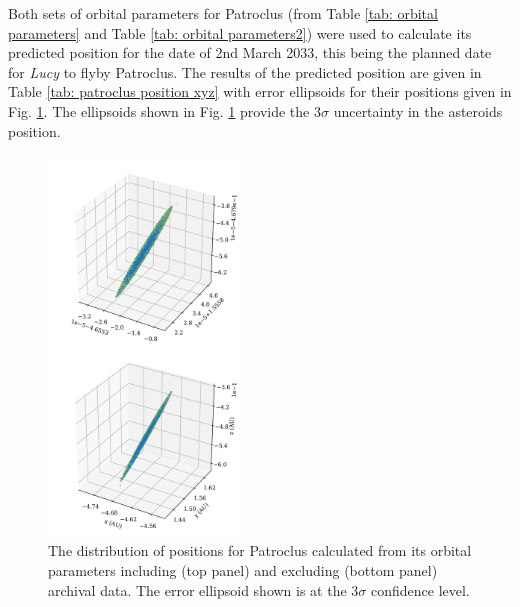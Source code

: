 \documentclass[10pt, twocolumn]{revtex4}    %
\begin{document}
Both sets of orbital parameters for Patroclus (from Table \ref{tab: orbital parameters} and Table \ref{tab: orbital parameters2}) were used to calculate its predicted position for the date of 2nd March 2033, this being the planned date for \textit{Lucy} to flyby Patroclus. The results of the predicted position are given in Table \ref{tab: patroclus position xyz} with error ellipsoids for their positions given in Fig. \ref{fig: pat position ellipsoid}. The ellipsoids shown in Fig. \ref{fig: pat position ellipsoid} provide the $3\sigma$ uncertainty in the asteroids position.

\begin{figure}[t!]
\centering
\includegraphics[width=0.45\textwidth]{20180411_125829_ERROR_ELLIPSOID_PAT}
\caption{The distribution of positions for Patroclus calculated from its orbital parameters including (top panel) and excluding (bottom panel) archival data. The error ellipsoid shown is at the $3\sigma$ confidence level.}
\label{fig: pat position ellipsoid}
\end{figure}
\end{document}
